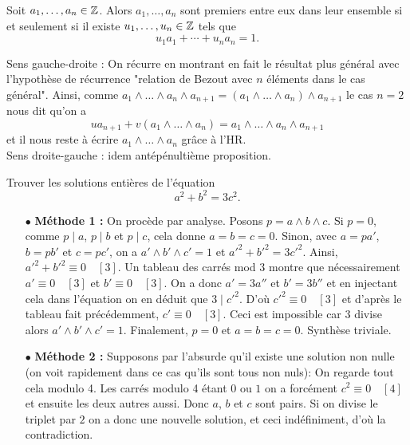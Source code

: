 \documentclass{magnolia}
\begin{document}
\begin{proposition}
Soit $a_1,\ldots,a_n\in\mathbb{Z}$. Alors $a_1,\ldots,a_n$ sont premiers entre eux dans leur
ensemble si et seulement si il existe $u_1,\ldots,u_n\in\mathbb{Z}$ tels que
\[u_1 a_1+\cdots+u_n a_n=1.\]
\end{proposition}

\begin{preuve}
Sens gauche-droite : On récurre en montrant en fait le résultat plus général avec l'hypothèse de récurrence "relation de Bezout avec $n$ éléments dans le cas général". Ainsi, comme $a_1\wedge \ldots \wedge a_n \wedge a_{n+1}=(a_1\wedge \ldots \wedge a_n) \wedge a_{n+1}$ le cas $n=2$ nous dit qu'on a $$ua_{n+1}+v(a_1\wedge \ldots \wedge a_n)=a_1\wedge \ldots \wedge a_n \wedge a_{n+1}$$ et il nous reste à écrire $a_1\wedge \ldots \wedge a_n$ grâce à l'HR.\\
Sens droite-gauche : idem antépénultième proposition.
\end{preuve}

\begin{exoUnique}
\exo Trouver les solutions entières de l'équation
  \[a^2+b^2=3c^2.\]
\end{exoUnique}

\begin{sol}
\begin{itemize}
\item[$\bullet$] \textbf{Méthode 1 :} On procède par analyse. Posons $p=a\wedge b \wedge c$. Si $p=0$, comme $p\mid a$, $p\mid b$ et $p\mid c$, cela donne $a=b=c=0$. Sinon, avec $a=pa'$, $b=pb'$ et $c=pc'$, on a $a'\wedge b' \wedge c'=1$ et $a'^2+b'^2=3c'^2$. Ainsi, $a'^2+b'^2\equiv 0 \quad [3]$. Un tableau des carrés mod $3$ montre que nécessairement $a'\equiv 0 \quad [3]$ et $b'\equiv 0 \quad [3]$. On a donc $a'=3a''$ et $b'=3b''$ et en injectant cela dans l'équation on en déduit que $3\mid c'^2$. D'où $c'^2\equiv 0 \quad [3]$ et d'après le tableau fait précédemment, $c'\equiv 0 \quad [3]$. Ceci est impossible car $3$ divise alors $a'\wedge b' \wedge c'=1$. Finalement, $p=0$ et $a=b=c=0$.
Synthèse triviale.
\item[$\bullet$] \textbf{Méthode 2 :}
Supposons par l'absurde qu'il existe une solution non nulle (on voit rapidement dans ce cas qu'ils sont tous non nuls): On regarde tout cela modulo 4. Les carrés modulo 4 étant $0$ ou $1$ on a forcément $c^2 \equiv 0 \quad [4]$ et ensuite les deux autres aussi. Donc $a$, $b$ et $c$ sont pairs. Si on divise le triplet par $2$ on a donc une nouvelle solution, et ceci indéfiniment, d'où la contradiction.
\end{itemize}
\end{sol}
\end{document}
